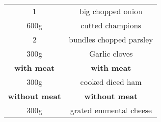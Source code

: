 \begin{tabular}{c | c}
  1 & big chopped onion\\
  600g & cutted champions \\
  2 & bundles chopped parsley \\
  300g & Garlic cloves \\
  \textbf{with meat} & \textbf{with meat}\\
  300g & cooked diced ham \\
  \textbf{without meat} & \textbf{without meat}\\
  300g & grated emmental cheese \\
\end{tabular}